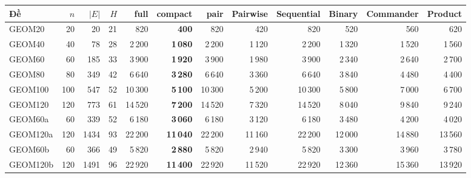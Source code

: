 \begin{tabular}{lrrrrrrrrrrr}
\toprule
Đề & $n$ & $|E|$ & $H$ & full & compact & pair & Pairwise & Sequential & Binary & Commander & Product \\
\midrule
GEOM20 & 20 & 20 & 21 & 820 & \textbf{400} & 820 & 420 & 820 & 520 & 560 & 620 \\
GEOM40 & 40 & 78 & 28 & 2\,200 & \textbf{1\,080} & 2\,200 & 1\,120 & 2\,200 & 1\,320 & 1\,520 & 1\,560 \\
GEOM60 & 60 & 185 & 33 & 3\,900 & \textbf{1\,920} & 3\,900 & 1\,980 & 3\,900 & 2\,340 & 2\,640 & 2\,700 \\
GEOM80 & 80 & 349 & 42 & 6\,640 & \textbf{3\,280} & 6\,640 & 3\,360 & 6\,640 & 3\,840 & 4\,480 & 4\,400 \\
GEOM100 & 100 & 547 & 52 & 10\,300 & \textbf{5\,100} & 10\,300 & 5\,200 & 10\,300 & 5\,800 & 7\,000 & 6\,700 \\
GEOM120 & 120 & 773 & 61 & 14\,520 & \textbf{7\,200} & 14\,520 & 7\,320 & 14\,520 & 8\,040 & 9\,840 & 9\,240 \\
GEOM60a & 60 & 339 & 52 & 6\,180 & \textbf{3\,060} & 6\,180 & 3\,120 & 6\,180 & 3\,480 & 4\,200 & 4\,020 \\
GEOM120a & 120 & 1434 & 93 & 22\,200 & \textbf{11\,040} & 22\,200 & 11\,160 & 22\,200 & 12\,000 & 14\,880 & 13\,560 \\
GEOM60b & 60 & 366 & 49 & 5\,820 & \textbf{2\,880} & 5\,820 & 2\,940 & 5\,820 & 3\,300 & 3\,960 & 3\,780 \\
GEOM120b & 120 & 1491 & 96 & 22\,920 & \textbf{11\,400} & 22\,920 & 11\,520 & 22\,920 & 12\,360 & 15\,360 & 13\,920 \\
\bottomrule
\end{tabular}
